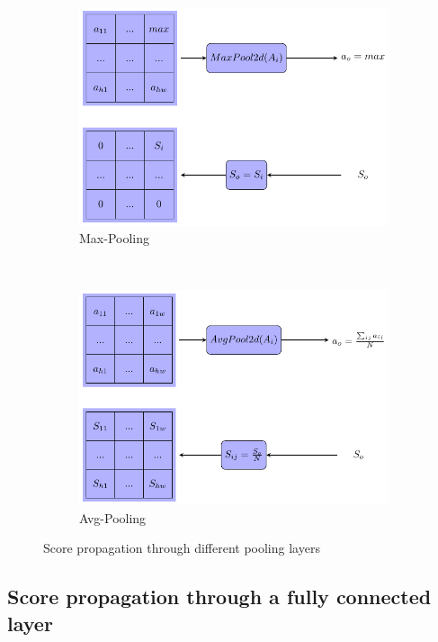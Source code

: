 \documentclass[preprint]{elsarticle}
\theoremstyle{definition} %
\theoremstyle{remark}
\begin{document}
\begin{figure}[h!]
	\centering
	\begin{subfigure}{0.4\textwidth}
		\includegraphics[scale=0.4]{figures/score_maxpool.pdf}
		\caption{Max-Pooling}
	\end{subfigure}
	~ %
	\begin{subfigure}{0.4\textwidth}
		\includegraphics[scale=0.4]{figures/score_avgpool.pdf}
		\caption{Avg-Pooling}
	\end{subfigure}
	\caption{Score propagation through different pooling layers}
	\label{fig:score_pooling}
\end{figure}

\subsection{Score propagation through a fully connected layer} 
\end{document}
